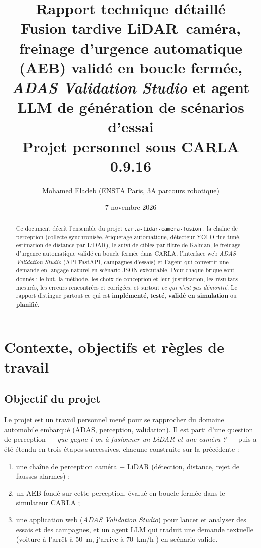 \documentclass[11pt,a4paper]{article}
\title{\Large\bfseries Rapport technique d\'etaill\'e\\[4pt]
\large Fusion tardive LiDAR--cam\'era, freinage d'urgence automatique (AEB) valid\'e en boucle ferm\'ee,\\
\emph{ADAS Validation Studio} et agent LLM de g\'en\'eration de sc\'enarios d'essai\\[4pt]
\normalsize Projet personnel sous CARLA 0.9.16}
\author{Mohamed Eladeb (ENSTA Paris, 3A parcours robotique)}
\date{7 novembre 2026}
\providecommand{\og}{\guillemotleft\nobreakspace}
\providecommand{\fg}{\nobreakspace\guillemotright}
\newcommand{\impl}{\textcolor{warnc}{\textbf{impl\'ement\'e}}}
\newcommand{\teste}{\textcolor{accent}{\textbf{test\'e}}}
\newcommand{\valide}{\textcolor{okc}{\textbf{valid\'e en simulation}}}
\newcommand{\plan}{\textcolor{badc}{\textbf{planifi\'e}}}
\newcommand{\code}[1]{\texttt{#1}}
\begin{document}
\maketitle
\thispagestyle{fancy}

\begin{abstract}
Ce document d\'ecrit l'ensemble du projet \code{carla-lidar-camera-fusion} : la cha\^ine de perception
(collecte synchronis\'ee, \'etiquetage automatique, d\'etecteur YOLO fine-tun\'e, estimation de distance par LiDAR),
le suivi de cibles par filtre de Kalman, le freinage d'urgence automatique valid\'e en boucle ferm\'ee dans CARLA,
l'interface web \emph{ADAS Validation Studio} (API FastAPI, campagnes d'essais) et l'agent qui convertit une demande
en langage naturel en sc\'enario JSON ex\'ecutable. Pour chaque brique sont donn\'es : le but, la m\'ethode, les choix
de conception et leur justification, les r\'esultats mesur\'es, les erreurs rencontr\'ees et corrig\'ees, et surtout
\emph{ce qui n'est pas d\'emontr\'e}. Le rapport distingue partout ce qui est \impl, \teste, \valide{} ou \plan.
\end{abstract}

\tableofcontents
\newpage

\section{Contexte, objectifs et r\`egles de travail}
\subsection{Objectif du projet}
Le projet est un travail personnel men\'e pour se rapprocher du domaine automobile embarqu\'e (ADAS, perception,
validation). Il est parti d'une question de perception --- \emph{que gagne-t-on \`a fusionner un LiDAR et une cam\'era ?}
--- puis a \'et\'e \'etendu en trois \'etapes successives, chacune construite sur la pr\'ec\'edente :
\begin{enumerate}
\item une cha\^ine de perception caméra + LiDAR (d\'etection, distance, rejet de fausses alarmes) ;
\item un AEB fond\'e sur cette perception, \'evalu\'e en boucle ferm\'ee dans le simulateur CARLA ;
\item une application web (\emph{ADAS Validation Studio}) pour lancer et analyser des essais et des campagnes, et un agent LLM qui
      traduit une demande textuelle (\og voiture \`a l'arr\^et \`a 50~m, j'arrive \`a 70~km/h \fg) en sc\'enario valide.
\end{enumerate}
\end{document}
